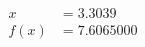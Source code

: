 \documentclass[preview]{standalone}
\begin{document}
\begin{align*}
x &= 3.3039\\f(x) &= 7.6065000
\end{align*}
\end{document}
